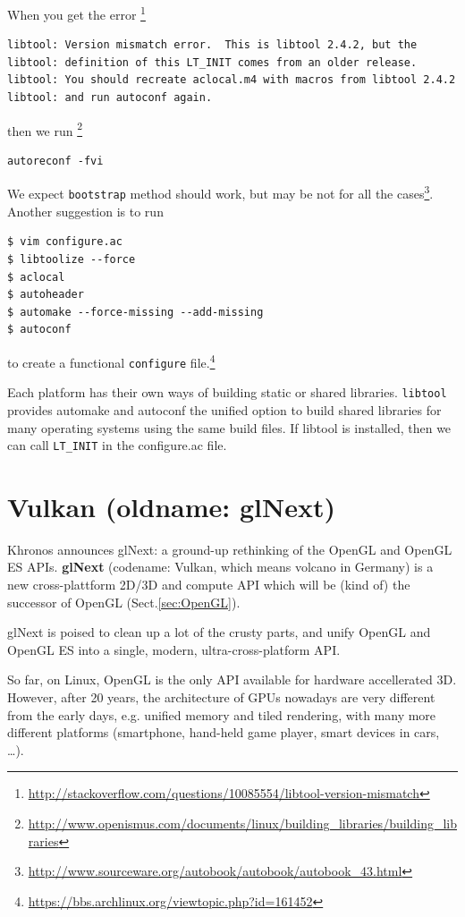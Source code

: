 When you get the error
\footnote{\url{http://stackoverflow.com/questions/10085554/libtool-version-mismatch}}
\begin{verbatim}
libtool: Version mismatch error.  This is libtool 2.4.2, but the
libtool: definition of this LT_INIT comes from an older release.
libtool: You should recreate aclocal.m4 with macros from libtool 2.4.2
libtool: and run autoconf again.
\end{verbatim}
then we run
\footnote{\url{http://www.openismus.com/documents/linux/building_libraries/building_libraries}}
\begin{verbatim}
autoreconf -fvi
\end{verbatim}
We expect \verb!bootstrap! method should work, but may be not for all the
cases\footnote{\url{http://www.sourceware.org/autobook/autobook/autobook_43.html}}.
Another suggestion is to run
\begin{verbatim}
$ vim configure.ac
$ libtoolize --force
$ aclocal
$ autoheader
$ automake --force-missing --add-missing
$ autoconf
\end{verbatim}
to create a functional \verb!configure!
file.\footnote{\url{https://bbs.archlinux.org/viewtopic.php?id=161452}}

\begin{framed}
Each platform has their own ways of building static or shared libraries.
\verb!libtool! provides automake and autoconf the unified option to build shared
libraries for  many operating systems using the same build files. 
If libtool is installed, then we can call \verb!LT_INIT! in the configure.ac
file. 
\end{framed}


\chapter{Vulkan (oldname: glNext)}
\label{chap:Vulkan}
\label{sec:Vulkan}


Khronos announces glNext: a ground-up rethinking of the OpenGL and OpenGL ES
APIs. {\bf glNext} (codename: Vulkan, which means volcano in Germany) is a new
cross-plattform 2D/3D and compute API which will be (kind of) the successor of
OpenGL (Sect.\ref{sec:OpenGL}).


glNext is poised to clean up a lot of the crusty parts, and unify OpenGL and
OpenGL ES into a single, modern, ultra-cross-platform API.

So far, on Linux, OpenGL is the only API available for hardware accellerated 3D.
However, after 20 years, the architecture of GPUs nowadays are very different
from the early days, e.g. unified memory and tiled rendering, with many more
different platforms (smartphone, hand-held game player, smart devices in cars,
\ldots). 

